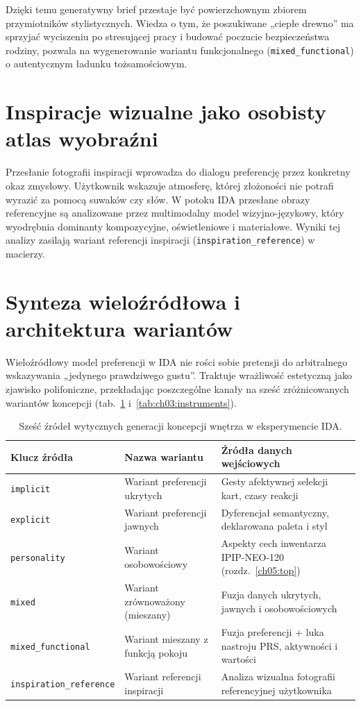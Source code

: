 Dzięki temu generatywny brief przestaje być powierzchownym zbiorem przymiotników stylistycznych. Wiedza o tym, że poszukiwane „ciepłe drewno” ma sprzyjać wyciszeniu po stresującej pracy i budować poczucie bezpieczeństwa rodziny, pozwala na wygenerowanie wariantu funkcjonalnego (\texttt{mixed\_functional}) o autentycznym ładunku tożsamościowym.

\section{Inspiracje wizualne jako osobisty atlas wyobraźni}
\label{ch03:sec:inspiracje}

Przesłanie fotografii inspiracji wprowadza do dialogu preferencję przez konkretny okaz zmysłowy. Użytkownik wskazuje atmosferę, której złożoności nie potrafi wyrazić za pomocą suwaków czy słów.
W potoku IDA przesłane obrazy referencyjne są analizowane przez multimodalny model wizyjno-językowy, który wyodrębnia dominanty kompozycyjne, oświetleniowe i materiałowe. Wyniki tej analizy zasilają wariant referencji inspiracji (\texttt{inspiration\_reference}) w macierzy.

\section{Synteza wieloźródłowa i architektura wariantów}
\label{ch03:sec:synteza}

Wieloźródłowy model preferencji w IDA nie rości sobie pretensji do arbitralnego wskazywania „jedynego prawdziwego gustu”. Traktuje wrażliwość estetyczną jako zjawisko polifoniczne, przekładając poszczególne kanały na sześć zróżnicowanych wariantów koncepcji (tab.~\ref{tab:ch03:sources} i~\ref{tab:ch03:instruments}).

\begin{table}[htbp]
  \centering
  \caption{Sześć źródeł wytycznych generacji koncepcji wnętrza w eksperymencie IDA.}
  \label{tab:ch03:sources}
  \begin{tabular}{@{}llp{}@{}}
    \toprule
    Klucz źródła & Nazwa wariantu & Źródła danych wejściowych \\
    \midrule
    \texttt{implicit}
      & Wariant preferencji ukrytych
      & Gesty afektywnej selekcji kart, czasy reakcji \\
    \texttt{explicit}
      & Wariant preferencji jawnych
      & Dyferencjał semantyczny, deklarowana paleta i styl \\
    \texttt{personality}
      & Wariant osobowościowy
      & Aspekty cech inwentarza IPIP-NEO-120 (rozdz.~\ref{ch05:top}) \\
    \texttt{mixed}
      & Wariant zrównoważony (mieszany)
      & Fuzja danych ukrytych, jawnych i osobowościowych \\
    \texttt{mixed\_functional}
      & Wariant mieszany z funkcją pokoju
      & Fuzja preferencji + luka nastroju PRS, aktywności i wartości \\
    \texttt{inspiration\_reference}
      & Wariant referencji inspiracji
      & Analiza wizualna fotografii referencyjnej użytkownika \\
    \bottomrule
  \end{tabular}
\end{table}


